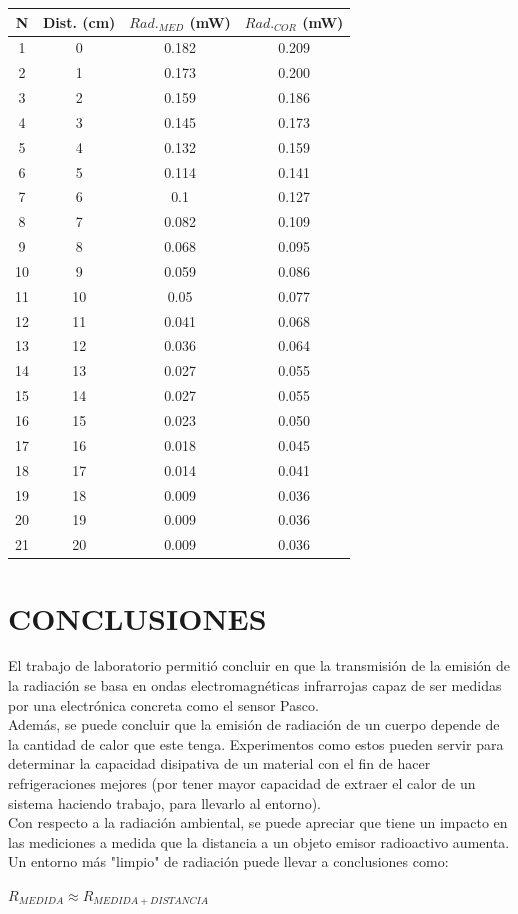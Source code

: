 \documentclass[a4paper]{article}
\begin{document}
		\begin{tabular}{ c  c  c  c }
			\toprule
			N \textdegree & Dist. (cm) & $Rad._{MED}$ (mW) & $Rad._{COR}$ (mW) \\
			\midrule
			1   &   0   & 0.182   & 0.209 \\
			2   &   1   & 0.173   & 0.200 \\
			3   &   2   & 0.159   & 0.186 \\
			4   &   3   & 0.145   & 0.173 \\
			5   &   4   & 0.132   & 0.159 \\
			6   &   5   & 0.114   & 0.141 \\
			7   &   6   & 0.1  	  & 0.127 \\
			8   &   7   & 0.082   & 0.109 \\
			9   &   8   & 0.068   & 0.095 \\
			10  &   9   & 0.059   & 0.086 \\
			11  &   10  & 0.05    & 0.077 \\
			12  &   11  & 0.041   & 0.068 \\
			13  &   12  & 0.036   & 0.064 \\
			14  &   13  & 0.027   & 0.055 \\
			15  &   14  & 0.027   & 0.055 \\
			16  &   15  & 0.023   & 0.050 \\
			17  &   16  & 0.018   & 0.045 \\
			18  &   17  & 0.014   & 0.041 \\
			19  &   18  & 0.009   & 0.036 \\
			20  &   19  & 0.009   & 0.036 \\
			21  &   20  & 0.009   & 0.036 \\
			\bottomrule
		\end{tabular}

	\section{CONCLUSIONES}
		\indent El trabajo de laboratorio permitió concluir en que la transmisión de la emisión de la radiación se basa en ondas electromagnéticas infrarrojas capaz de ser medidas por una electrónica concreta como el sensor Pasco. \\
		\indent Además, se puede concluir que la emisión de radiación de un cuerpo depende de la cantidad de calor que este tenga. Experimentos como estos pueden servir para determinar la capacidad disipativa de un material con el fin de hacer refrigeraciones mejores (por tener mayor capacidad de extraer el calor de un sistema haciendo trabajo, para llevarlo al entorno). \\
		\indent Con respecto a la radiación ambiental, se puede apreciar que tiene un impacto en las mediciones a medida que la distancia a un objeto emisor radioactivo aumenta. Un entorno más "limpio" de radiación puede llevar a conclusiones como: \\
		
		\begin{center}
			$R_{MEDIDA} \approx R_{MEDIDA + DISTANCIA}$
		\end{center}
		
\end{document}
